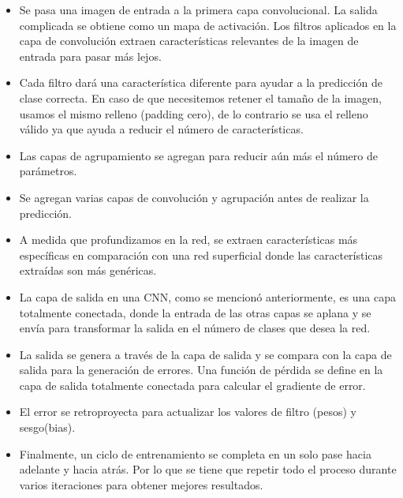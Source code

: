 \begin{itemize}
	\item Se pasa una imagen de entrada a la primera capa convolucional. La salida complicada se obtiene como un mapa de activación. Los filtros aplicados en la capa de convolución extraen características relevantes de la imagen de entrada para pasar más lejos.\vspace{-0.5em}

	\item Cada filtro dará una característica diferente para ayudar a la predicción de clase correcta. En caso de que necesitemos retener el tamaño de la imagen, usamos el mismo relleno (padding cero), de lo contrario se usa el relleno válido ya que ayuda a reducir el número de características. \vspace{-0.5em}

	\item Las capas de agrupamiento se agregan para reducir aún más el número de parámetros.\vspace{-0.5em}

	\item Se agregan varias capas de convolución y agrupación antes de realizar la predicción. \vspace{-0.5em}

	\item A medida que profundizamos en la red, se extraen características más específicas en comparación con una red superficial donde las características extraídas son más genéricas. \vspace{-0.5em}

	\item La capa de salida en una CNN, como se mencionó anteriormente, es una capa totalmente conectada, donde la entrada de las otras capas se aplana y se envía para transformar la salida en el número de clases que desea la red. \vspace{-0.5em}

	\item La salida se genera a través de la capa de salida y se compara con la capa de salida para la generación de errores. Una función de pérdida se define en la capa de salida totalmente conectada para calcular el gradiente de error. \vspace{-0.5em}

	\item El error se retroproyecta para actualizar los valores de filtro (pesos) y sesgo(bias). \vspace{-0.5em}
	
	\item Finalmente, un ciclo de entrenamiento se completa en un solo pase hacia adelante y hacia atrás. Por lo que se tiene que repetir todo el proceso durante varios iteraciones para obtener mejores resultados.\vspace{-0.5em}

\end{itemize}
\newpage
